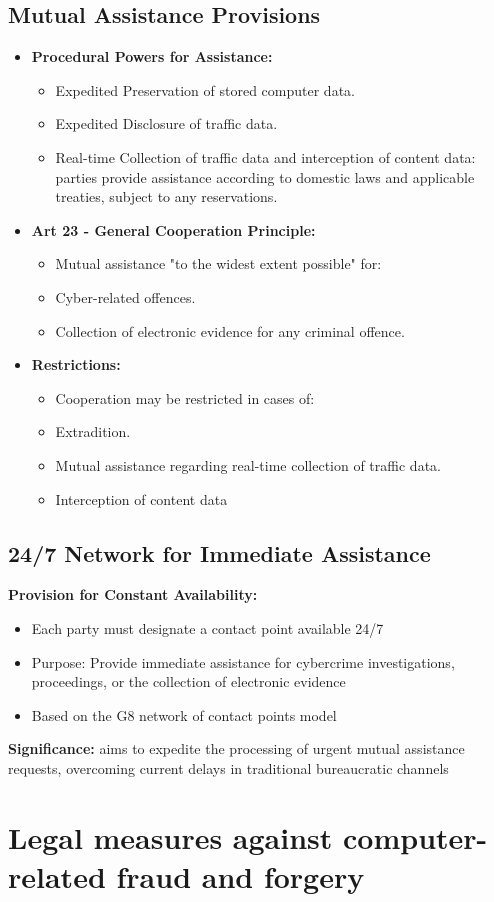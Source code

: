 \subsection{Mutual Assistance Provisions}
\begin{itemize}[itemsep=0pt]
  \item  \textbf{Procedural Powers for Assistance:}
    \begin{itemize}[itemsep=0pt]
      \item Expedited Preservation of stored computer data.
      \item Expedited Disclosure of traffic data.
      \item Real-time Collection of traffic data and interception of content data: parties provide assistance according to domestic laws and applicable treaties, subject to any reservations.
    \end{itemize}
  \item \textbf{Art 23 - General Cooperation Principle:}
    \begin{itemize}[itemsep=0pt]
      \item Mutual assistance "to the widest extent possible" for:
      \item Cyber-related offences.
      \item Collection of electronic evidence for any criminal offence.
    \end{itemize}
  \item \textbf{Restrictions:}
    \begin{itemize}[itemsep=0pt]
      \item Cooperation may be restricted in cases of:
      \item Extradition.
      \item Mutual assistance regarding real-time collection of traffic data.
      \item Interception of content data
    \end{itemize}
\end{itemize}

\subsection{24/7 Network for Immediate Assistance}
\textbf{Provision for Constant Availability:}
\begin{itemize}[itemsep=0pt]
  \item Each party must designate a contact point available 24/7
  \item Purpose: Provide immediate assistance for cybercrime investigations, proceedings, or the collection of electronic evidence
  \item Based on the G8 network of contact points model
\end{itemize}
\textbf{Significance:} aims to expedite the processing of urgent
mutual assistance requests, overcoming current delays in
traditional bureaucratic channels

\section{Legal measures against computer-related fraud and forgery}
